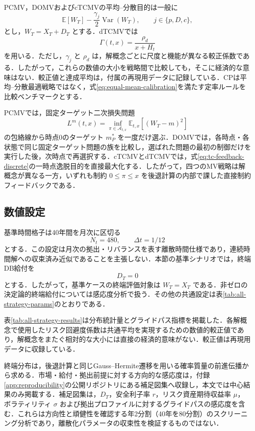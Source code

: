 \documentclass[10pt,a4paper]{article}
\theoremstyle{plain}
\theoremstyle{definition}
\newcommand{\E}{\mathbb{E}}
\DeclareMathOperator{\Var}{Var}
\begin{document}
PCMV，DOMVおよびcTCMVの平均--分散目的は一般に
\begin{equation}
  \E[W_T]-\frac{\gamma_j}{2}\Var(W_T),
  \qquad j\in\{p,D,c\},
  \label{eq:common-mv-gamma}
\end{equation}
とし，$W_T=X_T+D_T$ とする．dTCMVでは
\begin{equation}
  \Gamma(t,x)=\frac{\rho_d}{x+H_t}
\end{equation}
を用いる．ただし，$\gamma_j$ と $\rho_d$ は，解概念ごとに尺度と機能が異なる較正係数である．したがって，これらの数値の大小を戦略間で比較しても，そこに経済的な意味はない．較正値と達成平均は，付属の再現用データに記録している．CPは平均--分散最適戦略ではなく，式\eqref{eq:equal-mean-calibration}を満たす定率ルールを比較ベンチマークとする．

PCMVでは，固定ターゲット二次損失問題
\begin{equation}
  L^m(t,x)=\inf_{\pi\in\mathcal A_{t,x}}\E_{t,x}[(W_T-m)^2]
\end{equation}
の包絡線から時点0のターゲット $m_P^*$ を一度だけ選ぶ．DOMVでは，各時点・各状態で同じ固定ターゲット問題の族を比較し，選ばれた問題の最初の制御だけを実行した後，次時点で再選択する．cTCMVとdTCMVでは，式\eqref{eq:tc-feedback-discrete}の一時点逸脱目的を直接最大化する．したがって，四つのMV戦略は解概念が異なる一方，いずれも制約 $0\leq\pi\leq x$ を後退計算の内部で課した直接制約フィードバックである．

\subsection{数値設定}

基準時間格子は40年間を月次に区切る
\[
  N_t=480,\qquad \Delta t=1/12
\]
とする．この設定は月次の拠出・リバランスを表す離散時間仕様であり，連続時間解への収束済み近似であることを主張しない．本節の基準シナリオでは，終端DB給付を
\[
  D_T=0
\]
とする．したがって，基準ケースの終端評価対象は $W_T=X_T$ である．非ゼロの決定論的終端給付については感応度分析で扱う．その他の共通設定は表\ref{tab:all-strategy-params}のとおりである．



表\ref{tab:all-strategy-results}は分布統計量とグライドパス指標を掲載した．各解概念で使用したリスク回避度係数は共通平均を実現するための数値的較正値であり，解概念をまたぐ相対的な大小には直接の経済的意味がない．較正値は再現用データに収録している．

終端分布は，後退計算と同じGauss--Hermite遷移を用いる確率質量の前進伝播から求める．市場・給付・拠出前提に対する方向的な感応度は，付録\ref{app:reproducibility}の公開リポジトリにある補足図集へ収録し，本文では中心結果のみ掲載する．補足図集は，$D_T$，安全利子率 $r$，リスク資産期待収益率 $\mu$，ボラティリティ $\sigma$ および拠出プロファイルに対するグライドパスの感応度を含む．これらは方向性と頑健性を確認する年2分割（40年を80分割）のスクリーニング分析であり，離散化パラメータの収束性を検証するものではない．
\end{document}
